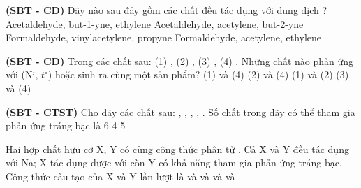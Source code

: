 \documentclass[12pt,a4paper]{article}
\begin{document}
\begin{ex}
\textbf{(SBT - CD)} Dãy nào sau đây gồm các chất đều tác dụng với dung dịch ?
\choice
{Acetaldehyde, but-1-yne, ethylene}
{Acetaldehyde, acetylene, but-2-yne}
{\True Formaldehyde, vinylacetylene, propyne}
{Formaldehyde, acetylene, ethylene}

\end{ex}

\begin{ex}
\textbf{(SBT - CD)} Trong các chất sau: (1) , (2) , (3) , (4) . Những chất nào phản ứng với  (Ni, $t^\circ$) hoặc  sinh ra cùng một sản phẩm?
\choice
{\True (1) và (4)}
{(2) và (4)}
{(1) và (2)}
{(3) và (4)}

\end{ex}

\begin{ex}
\textbf{(SBT - CTST)} Cho dãy các chất sau: , , , , . Số chất trong dãy có thể tham gia phản ứng tráng bạc là
\choice
{}
{6}
{4}
{5}

\end{ex}

\begin{ex}
Hai hợp chất hữu cơ X, Y có cùng công thức phân tử . Cả X và Y đều tác dụng với Na; X tác dụng được với  còn Y có khả năng tham gia phản ứng tráng bạc. Công thức cấu tạo của X và Y lần lượt là
\choice
{ và }
{ và }
{ và }
{\True {} và }

\end{ex}
\end{document}
